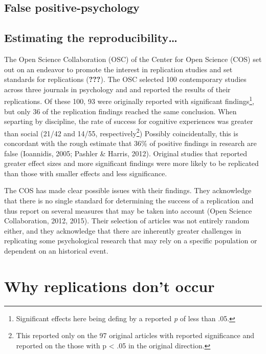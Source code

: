 \documentclass[man]{apa6}
\let\rmarkdownfootnote\footnote%
\def\footnote{\protect\rmarkdownfootnote}
\theoremstyle{definition}
\theoremstyle{definition}
\theoremstyle{definition}
\theoremstyle{remark}
\begin{document}
\hypertarget{false-positive-psychology}{%
\subsection{False positive-psychology}\label{false-positive-psychology}}

\hypertarget{estimating-the-reproducibility}{%
\subsection{Estimating the
reproducibility\ldots{}}\label{estimating-the-reproducibility}}

The Open Science Collaboration (OSC) of the Center for Open Science
(COS) set out on an endeavor to promote the interest in replication
studies and set standards for replications ({\textbf{???}}). The OSC
selected 100 contemporary studies across three journals in psychology
and and reported the results of their replications. Of these 100, 93
were originally reported with significant findings\footnote{Significant
  effects here being defing by a reported \emph{p} of less than .05.},
but only 36 of the replication findings reached the same conclusion.
When separting by discipline, the rate of success for cognitive
experiences was greater than social (21/42 and 14/55,
respectively\footnote{This reported only on the 97 original articles
  with reported significance and reported on the those with p
  \textless{} .05 in the original direction.}) Possibly coincidentally,
this is concordant with the rough estimate that 36\% of positive
findings in research are false (Ioannidis, 2005; Pashler \& Harris,
2012). Original studies that reported greater effect sizes and more
significant findings were more likely to be replicated than those with
smaller effects and less significance.

The COS has made clear possible issues with their findings. They
acknowledge that there is no single standard for determining the success
of a replication and thus report on several measures that may be taken
into account (Open Science Collaboration, 2012, 2015). Their selection
of articles was not entirely random either, and they acknowledge that
there are inherently greater challenges in replicating some
psychological research that may rely on a specific population or
dependent on an historical event.

\hypertarget{why-replications-dont-occur}{%
\section{Why replications don't
occur}\label{why-replications-dont-occur}}
\end{document}
